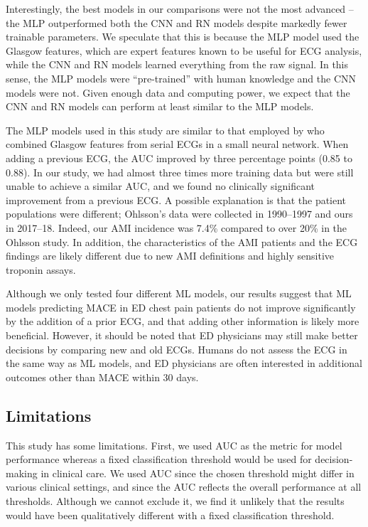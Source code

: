 \documentclass[preprint]{elsarticle}
\begin{document}
Interestingly, the best models in our comparisons were not the most advanced – the MLP outperformed both the CNN and RN models despite markedly fewer trainable parameters. We speculate that this is because the MLP model used the Glasgow features, which are expert features known to be useful for ECG analysis, while the CNN and RN models learned everything from the raw signal. In this sense, the MLP models were ``pre-trained'' with human knowledge and the CNN models were not. Given enough data and computing power, we expect that the CNN and RN models can perform at least similar to the MLP models.

The MLP models used in this study are similar to that employed by \citet{ohlsson2001} who combined Glasgow features from serial ECGs in a small neural network. When adding a previous ECG, the AUC improved by three percentage points (0.85 to 0.88). In our study, we had almost three times more training data but were still unable to achieve a similar AUC, and we found no clinically significant improvement from a previous ECG. A possible explanation is that the patient populations were different; Ohlsson's data were collected in 1990--1997 and ours in 2017--18. Indeed, our AMI incidence was 7.4\% compared to over 20\% in the Ohlsson study. In addition, the characteristics of the AMI patients and the ECG findings are likely different due to new AMI definitions and highly sensitive troponin assays. 

Although we only tested four different ML models, our results suggest that ML models predicting MACE in ED chest pain patients do not improve significantly by the addition of a prior ECG, and that adding other information is likely more beneficial. However, it should be noted that ED physicians may still make better decisions by comparing new and old ECGs. Humans do not assess the ECG in the same way as ML models, and ED physicians are often interested in additional outcomes other than MACE within 30 days.

\subsection{Limitations}
This study has some limitations. First, we used AUC as the metric for model performance whereas a fixed classification threshold would be used for decision-making in clinical care. We used AUC since the chosen threshold might differ in various clinical settings, and since the AUC reflects the overall performance at all thresholds. Although we cannot exclude it, we find it unlikely that the results would have been qualitatively different with a fixed classification threshold.
\end{document}
